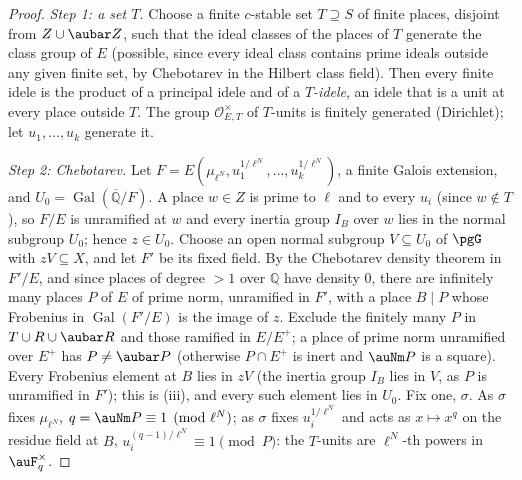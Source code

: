 \documentclass[10pt]{amsart}
\theoremstyle{definition}
\theoremstyle{remark}
\newcommand{\Q}{\mathbb Q}
\begin{document}
\begin{proof}
\emph{Step 1: a set $T$.} Choose a finite $c$-stable set $T\supseteq S$ of finite places, disjoint
from $Z\cup\aubar Z$, such that the ideal classes of the places of $T$ generate the class group of
$E$ (possible, since every ideal class contains prime ideals outside any given finite set, by
Chebotarev in the Hilbert class field). Then every finite idele is the product of a principal idele
and of a \emph{$T$-idele}, an idele that is a unit at every place outside $T$. The group
$\mathcal O_{E,T}^\times$ of $T$-units is finitely generated (Dirichlet); let $u_1,\dots,u_k$
generate it.

\emph{Step 2: Chebotarev.} Let $F=E(\mu_{\ell^N},u_1^{1/\ell^N},\dots,u_k^{1/\ell^N})$, a finite
Galois extension, and $U_0=\operatorname{Gal}(\overline{\Q}/F)$. A place $w\in Z$ is prime to
$\ell$ and to every $u_i$ (since $w\notin T$), so $F/E$ is unramified at $w$ and every inertia group
$I_B$ over $w$ lies in the normal subgroup $U_0$; hence $z\in U_0$. Choose an open normal subgroup
$V\subseteq U_0$ of $\pgG$ with $zV\subseteq X$, and let $F'$ be its fixed field. By the Chebotarev
density theorem in $F'/E$, and since places of degree $>1$ over $\Q$ have density $0$, there are
infinitely many places $P$ of $E$ of prime norm, unramified in $F'$, with a place $B\mid P$ whose
Frobenius in $\operatorname{Gal}(F'/E)$ is the image of $z$. Exclude the finitely many $P$ in
$T\cup R\cup\aubar R$ and those ramified in $E/E^+$; a place of prime norm unramified over $E^+$ has
$P\ne\aubar P$ (otherwise $P\cap E^+$ is inert and $\auNm P$ is a square). Every Frobenius element
at $B$ lies in $zV$ (the inertia group $I_B$ lies in $V$, as $P$ is unramified in $F'$); this is
(iii), and every such element lies in $U_0$. Fix one, $\sigma$. As $\sigma$ fixes $\mu_{\ell^N}$,
$q=\auNm P\equiv1\pmod{\ell^N}$; as $\sigma$ fixes $u_i^{1/\ell^N}$ and acts as $x\mapsto x^q$ on the
residue field at $B$, $u_i^{(q-1)/\ell^N}\equiv1\pmod P$: the $T$-units are $\ell^N$-th powers in
$\auF_q^\times$.


\end{proof}
\end{document}
